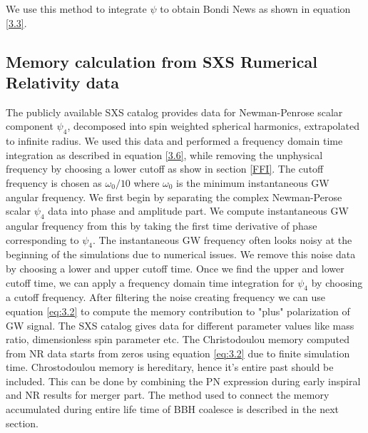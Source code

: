 \documentclass[twocolumn,showpacs,aps,prd,nobibnotes,floatfix]{revtex4-1}
\begin{document}
We use this method to integrate $\psi$ to obtain Bondi News as shown in equation \ref{3.3}.

\subsection{Memory calculation from SXS Rumerical Relativity data}
The publicly available SXS catalog provides data for Newman-Penrose scalar component $\psi_4$, decomposed into spin weighted spherical harmonics, extrapolated to infinite radius. We used this data and  performed a frequency domain time integration as described in equation \ref{3.6}, while removing the unphysical frequency by choosing a lower cutoff as show in section \ref{FFI}. The cutoff frequency is chosen as $\omega_0/10$ where $\omega_0$ is the minimum instantaneous GW angular frequency. We first begin by separating the complex Newman-Perose scalar $\psi_4$ data into phase and amplitude part. We compute instantaneous GW angular frequency from this by taking the first time derivative of phase corresponding to $\psi_4$. The instantaneous GW frequency often looks noisy at the beginning of the simulations due to numerical issues. We remove this noise data by choosing a lower and upper cutoff time. Once we find the upper and lower cutoff time, we can apply a frequency domain time integration for $\psi_4$ by choosing a cutoff frequency. After filtering the noise creating frequency we can use equation \ref{eq:3.2} to compute the memory contribution to "plus" polarization of GW signal. The SXS catalog gives data for different parameter values like mass ratio, dimensionless spin parameter etc. The Christodoulou memory computed from NR data starts from zeros using equation \ref{eq:3.2} due to finite simulation time. Chrostodoulou memory is hereditary, hence it's entire past should be included. This can be done by combining the PN expression during early inspiral and NR results for merger part. The method used to connect the memory accumulated during entire life time of BBH coalesce is described in the next section. 
\end{document}
